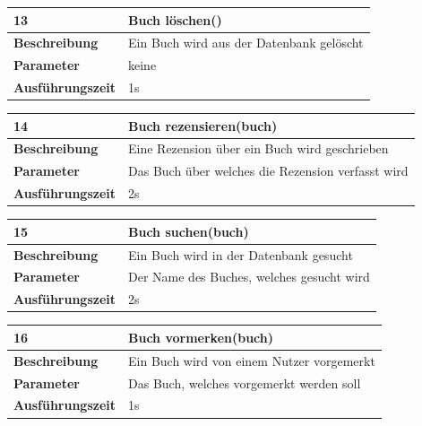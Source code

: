 \documentclass[fontsize=12pt,paper=a4,twoside]{scrartcl}
\begin{document}
\begin{table}
	[H] \label{a13} 
	\begin{tabular}
		{|l|p{10cm}|} \hline \textbf{13} & \textbf{Buch löschen()} \\
		\hline \textbf{Beschreibung} & Ein Buch wird aus der Datenbank gelöscht\\
		\hline \textbf{Parameter} & keine \\
		\hline \textbf{Ausführungszeit} & 1s\\
		\hline 
	\end{tabular}
\end{table}
\begin{table}
	[H] \label{a14} 
	\begin{tabular}
		{|l|p{10cm}|} \hline \textbf{14} & \textbf{Buch rezensieren(buch)} \\
		\hline \textbf{Beschreibung} & Eine Rezension über ein Buch wird geschrieben\\
		\hline \textbf{Parameter} & Das Buch über welches die Rezension verfasst wird \\
		\hline \textbf{Ausführungszeit} & 2s\\
		\hline 
	\end{tabular}
\end{table}
\begin{table}
	[H] \label{a15} 
	\begin{tabular}
		{|l|p{10cm}|} \hline \textbf{15} & \textbf{Buch suchen(buch)} \\
		\hline \textbf{Beschreibung} & Ein Buch wird in der Datenbank gesucht\\
		\hline \textbf{Parameter} & Der Name des Buches, welches gesucht wird \\
		\hline \textbf{Ausführungszeit} & 2s\\
		\hline 
	\end{tabular}
\end{table}
\begin{table}
	[H] \label{a16} 
	\begin{tabular}
		{|l|p{10cm}|} \hline \textbf{16} & \textbf{Buch vormerken(buch)} \\
		\hline \textbf{Beschreibung} & Ein Buch wird von einem Nutzer vorgemerkt\\
		\hline \textbf{Parameter} & Das Buch, welches vorgemerkt werden soll \\
		\hline \textbf{Ausführungszeit} & 1s\\
		\hline 
	\end{tabular}
\end{table}
\end{document}
